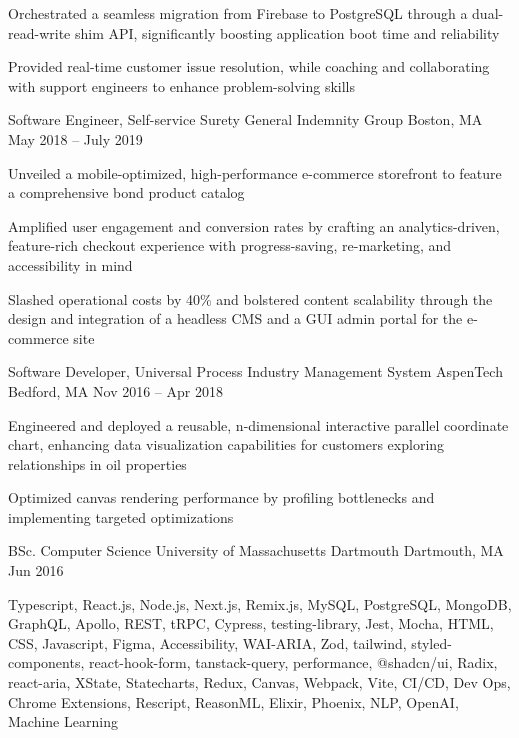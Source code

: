\documentclass[]{awesome-cv}
\begin{document}
\begin{cventries}
{\begin{cvitems}
		\item {Orchestrated a seamless migration from Firebase to PostgreSQL through a dual-read-write shim API, significantly boosting application boot time and reliability}
		\item {Provided real-time customer issue resolution, while coaching and collaborating with support engineers to enhance problem-solving skills}
		\end{cvitems}}
	\cventry
	{Software Engineer, Self-service Surety}
	{General Indemnity Group}
	{Boston, MA}
	{May 2018 – July 2019}
	{\begin{cvitems}
		\item {Unveiled a mobile-optimized, high-performance e-commerce storefront to feature a comprehensive bond product catalog}
		\item {Amplified user engagement and conversion rates by crafting an analytics-driven, feature-rich checkout experience with progress-saving, re-marketing, and accessibility in mind}
		\item {Slashed operational costs by 40\% and bolstered content scalability through the design and integration of a headless CMS and a GUI admin portal for the e-commerce site}
		\end{cvitems}}
	\cventry
	{Software Developer, Universal Process Industry Management System} 
	{AspenTech}
	{Bedford, MA}
	{Nov 2016 – Apr 2018}
	{\begin{cvitems}
		\item {Engineered and deployed a reusable, n-dimensional interactive parallel coordinate chart, enhancing data visualization capabilities for customers exploring relationships in oil properties}
		\item {Optimized canvas rendering performance by profiling bottlenecks and implementing targeted optimizations}
		\end{cvitems}}
\end{cventries}

\vspace{-2mm}
\begin{cvhonors}
	\cvhonor
	{BSc. Computer Science}
	{University of Massachusetts Dartmouth}
	{Dartmouth, MA}
	{Jun 2016}
\end{cvhonors}
\vspace{-2mm}
Typescript, React.js, Node.js, Next.js, Remix.js, MySQL, PostgreSQL, MongoDB, GraphQL, Apollo, REST, tRPC, Cypress, testing-library, Jest, Mocha, HTML, CSS, Javascript, Figma, Accessibility, WAI-ARIA, Zod, tailwind, styled-components, react-hook-form, tanstack-query, performance, @shadcn/ui, Radix, react-aria, XState, Statecharts, Redux, Canvas, Webpack, Vite, CI/CD, Dev Ops, Chrome Extensions, Rescript, ReasonML, Elixir, Phoenix, NLP, OpenAI, Machine Learning
\end{document}
